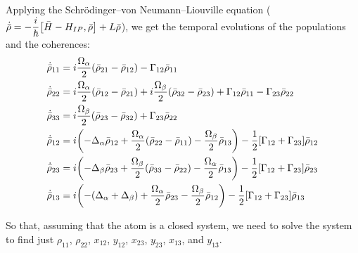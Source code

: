 Applying the Schrödinger--von Neumann--Liouville equation ($\dot{\bar{\rho}} = - \dfrac{i}{\hbar} \comm{\bar{H} - H_{IP}}{\bar{\rho}} + L \bar{\rho}$), we get the temporal evolutions of the populations and the coherences:
\begin{subequations}
\begin{align}
	\dot{\bar{\rho}}_{11} &= i \frac{\Omega_{\alpha}}{2} (\bar{\rho}_{21} - \bar{\rho}_{12}) - \Gamma_{12} \bar{\rho}_{11} \\
	\dot{\bar{\rho}}_{22} &= i \frac{\Omega_{\alpha}}{2} (\bar{\rho}_{12} - \bar{\rho}_{21}) + i \frac{\Omega_{\beta}}{2} (\bar{\rho}_{32} - \bar{\rho}_{23}) + \Gamma_{12} \bar{\rho}_{11} - \Gamma_{23} \bar{\rho}_{22}\\
	\dot{\bar{\rho}}_{33} &= i \frac{\Omega_{\beta}}{2} (\bar{\rho}_{23} - \bar{\rho}_{32}) + \Gamma_{23} \bar{\rho}_{22}\\
	\dot{\bar{\rho}}_{12} &= i \qty( -\Delta_{\alpha} \bar{\rho}_{12} + \frac{\Omega_{\alpha}}{2} (\bar{\rho}_{22} - \bar{\rho}_{11}) - \frac{\Omega_{\beta}}{2} \bar{\rho}_{13}) - \frac{1}{2}\qty[\Gamma_{12} + \Gamma_{23}] \bar{\rho}_{12} \\
	\dot{\bar{\rho}}_{23} &= i \qty( -\Delta_{\beta} \bar{\rho}_{23} + \frac{\Omega_{\beta}}{2} (\bar{\rho}_{33} - \bar{\rho}_{22}) - \frac{\Omega_{\alpha}}{2} \bar{\rho}_{13}) - \frac{1}{2}\qty[\Gamma_{12} + \Gamma_{23}] \bar{\rho}_{23} \\
	\dot{\bar{\rho}}_{13} &= i \qty( -(\Delta_{\alpha} + \Delta_{\beta}) + \frac{\Omega_{\alpha}}{2} \bar{\rho}_{23} - \frac{\Omega_{\beta}}{2} \bar{\rho}_{12}) - \frac{1}{2}\qty[\Gamma_{12} + \Gamma_{23}] \bar{\rho}_{13}
\end{align}
\end{subequations}


So that, assuming that the atom is a closed system, we need to solve the system to find just $\rho_{11}$, $\rho_{22}$, $x_{12}$, $y_{12}$, $x_{23}$, $y_{23}$, $x_{13}$, and $y_{13}$.

\newpage
